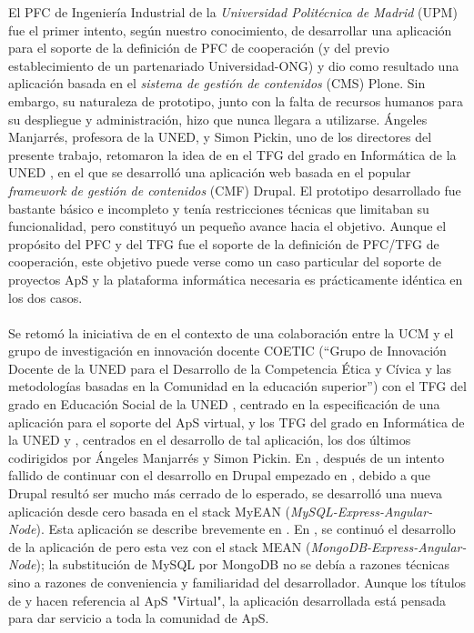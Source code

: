 \documentclass[11pt]{book}
\begin{document}
	El PFC de Ingeniería Industrial de la
	\emph{Universidad Politécnica de Madrid} (UPM) \cite{ref1} fue el primer intento, según
	nuestro conocimiento, de desarrollar una aplicación para el soporte de
	la definición de PFC de cooperación (y del previo establecimiento de un
	partenariado Universidad-ONG) y dio como resultado una aplicación basada
	en el \emph{sistema de gestión de contenidos} (CMS) Plone. Sin embargo, su
	naturaleza de prototipo, junto con la falta de recursos humanos para su
	despliegue y administración, hizo que nunca llegara a utilizarse.
	Ángeles Manjarrés, profesora de la UNED, y Simon Pickin, uno de los directores del presente
	trabajo, retomaron la idea de \cite{ref1} en el TFG del grado en Informática de
	la UNED \cite{ref2}, en el que se desarrolló una aplicación web basada en el
	popular \emph{framework de gestión de contenidos} (CMF) Drupal. El prototipo
	desarrollado fue bastante básico e incompleto y tenía restricciones
	técnicas que limitaban su funcionalidad, pero constituyó un pequeño
	avance hacia el objetivo. Aunque el propósito del PFC \cite{ref1} y del TFG \cite{ref2}
	fue el soporte de la definición de PFC/TFG de cooperación, este objetivo
	puede verse como un caso particular del soporte de proyectos ApS y la
	plataforma informática necesaria es prácticamente idéntica en los dos casos.
	\\\\
	Se retomó la iniciativa de \cite{ref2} en el contexto de una colaboración entre
	la UCM y el grupo de investigación en innovación docente COETIC (“Grupo
	de Innovación Docente de la UNED para el Desarrollo de la Competencia
	Ética y Cívica y las metodologías basadas en la Comunidad en la
	educación superior”) con el TFG del grado en Educación Social de la UNED
	\cite{ref3}, centrado en la especificación de una aplicación para el soporte del
	ApS virtual, y los TFG del grado en Informática de la UNED \cite{ref4} y \cite{ref5},
	centrados en el desarrollo de tal aplicación, los dos últimos
	codirigidos por Ángeles Manjarrés y Simon Pickin. En \cite{ref4}, después de un
	intento fallido de continuar con el desarrollo en Drupal empezado en
	\cite{ref3}, debido a que Drupal resultó ser mucho más cerrado de lo esperado,
	se desarrolló una nueva aplicación desde cero basada en el stack MyEAN
	(\emph{MySQL-Express-Angular-Node}). Esta aplicación se describe brevemente en
	\cite{ref6}. En \cite{ref5}, se continuó el desarrollo de la aplicación de \cite{ref4} pero esta
	vez con el stack MEAN (\emph{MongoDB-Express-Angular-Node}); la substitución de
	MySQL por MongoDB no se debía a razones técnicas sino a razones de
	conveniencia y familiaridad del desarrollador. Aunque los títulos de \cite{ref4}
	y \cite{ref5} hacen referencia al ApS "Virtual", la aplicación desarrollada está
	pensada para dar servicio a toda la comunidad de ApS.
	
\end{document}
